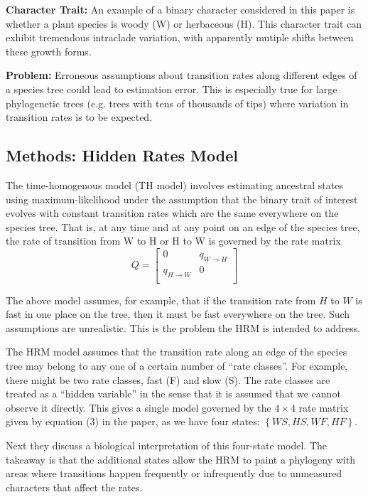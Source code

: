 \documentclass{article}
\begin{document}
\textbf{Character Trait:} An example of a binary character considered in this
paper is whether a plant species is woody (W) or herbaceous (H). This character
trait can exhibit tremendous intraclade variation, with apparently mutiple
shifts between these growth forms.

\textbf{Problem:} Erroneous assumptions about transition rates along different
edges of a species tree could lead to estimation error. This is especially true
for large phylogenetic trees (e.g. trees with tens of thousands of tips) where
variation in transition rates is to be expected.

\subsection{Methods: Hidden Rates Model}

\begin{definition}
  The time-homogenous model (TH model) involves estimating ancestral states
  using maximum-likelihood under the assumption that the binary trait of
  interest evolves with constant transition rates which are the same everywhere
  on the species tree. That is, at any time and at any point on an edge of the
  species tree, the rate of transition from W to H or H to W is governed by the
  rate matrix
  \begin{equation*}
    Q =
    \begin{bmatrix}
      0&q_{W\to H}\\
      q_{H\to W}&0\\
    \end{bmatrix}
  \end{equation*}
\end{definition}
\begin{remark}
  The above model assumes, for example, that if the transition rate from $H$ to
  $W$ is fast in one place on the tree, then it must be fast everywhere on the
  tree. Such assumptions are unrealistic. This is the problem the HRM is
  intended to address.
\end{remark}

The HRM model assumes that the transition rate along an edge of the species tree
may belong to any one of a certain number of ``rate classes''. For example,
there might be two rate classes, fast (F) and slow (S). The rate classes are
treated as a ``hidden variable'' in the sense that it is assumed that we cannot
observe it directly. This gives a single model governed by the $4\times4$ rate
matrix given by equation (3) in the paper, as we have four states:
$\left\{ WS, HS, WF, HF \right\}$.

Next they discuss a biological interpretation of this four-state model. The
takeaway is that the additional states allow the HRM to paint a phylogeny with
areas where transitions happen frequently or infrequently due to unmeasured
characters that affect the rates.
\end{document}
